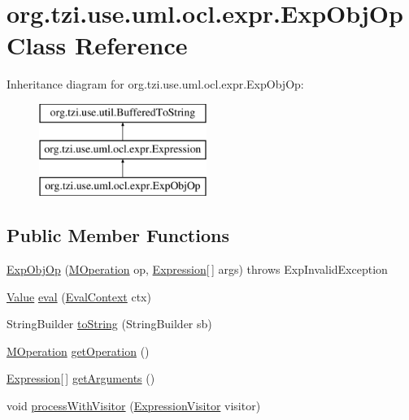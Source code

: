 \hypertarget{classorg_1_1tzi_1_1use_1_1uml_1_1ocl_1_1expr_1_1_exp_obj_op}{\section{org.\-tzi.\-use.\-uml.\-ocl.\-expr.\-Exp\-Obj\-Op Class Reference}
\label{classorg_1_1tzi_1_1use_1_1uml_1_1ocl_1_1expr_1_1_exp_obj_op}
}
Inheritance diagram for org.\-tzi.\-use.\-uml.\-ocl.\-expr.\-Exp\-Obj\-Op\-:\begin{figure}[H]
\begin{center}
\leavevmode
\includegraphics[height=3.000000cm]{classorg_1_1tzi_1_1use_1_1uml_1_1ocl_1_1expr_1_1_exp_obj_op}
\end{center}
\end{figure}
\subsection*{Public Member Functions}
\begin{DoxyCompactItemize}
\item 
\hyperlink{classorg_1_1tzi_1_1use_1_1uml_1_1ocl_1_1expr_1_1_exp_obj_op_ac3a6d164172e7e2cd17d68b379feb969}{Exp\-Obj\-Op} (\hyperlink{classorg_1_1tzi_1_1use_1_1uml_1_1mm_1_1_m_operation}{M\-Operation} op, \hyperlink{classorg_1_1tzi_1_1use_1_1uml_1_1ocl_1_1expr_1_1_expression}{Expression}\mbox{[}$\,$\mbox{]} args)  throws Exp\-Invalid\-Exception     
\item 
\hyperlink{classorg_1_1tzi_1_1use_1_1uml_1_1ocl_1_1value_1_1_value}{Value} \hyperlink{classorg_1_1tzi_1_1use_1_1uml_1_1ocl_1_1expr_1_1_exp_obj_op_aae1c9d0343e090c25177fbd990f68c0a}{eval} (\hyperlink{classorg_1_1tzi_1_1use_1_1uml_1_1ocl_1_1expr_1_1_eval_context}{Eval\-Context} ctx)
\item 
String\-Builder \hyperlink{classorg_1_1tzi_1_1use_1_1uml_1_1ocl_1_1expr_1_1_exp_obj_op_a5f97f040f8ad6763dae2c81bb9fa634e}{to\-String} (String\-Builder sb)
\item 
\hyperlink{classorg_1_1tzi_1_1use_1_1uml_1_1mm_1_1_m_operation}{M\-Operation} \hyperlink{classorg_1_1tzi_1_1use_1_1uml_1_1ocl_1_1expr_1_1_exp_obj_op_a78a791b79eb608d7fae7ea210d9b2c28}{get\-Operation} ()
\item 
\hyperlink{classorg_1_1tzi_1_1use_1_1uml_1_1ocl_1_1expr_1_1_expression}{Expression}\mbox{[}$\,$\mbox{]} \hyperlink{classorg_1_1tzi_1_1use_1_1uml_1_1ocl_1_1expr_1_1_exp_obj_op_a27a3c6ff5f189de3e93db079cb5b8228}{get\-Arguments} ()
\item 
void \hyperlink{classorg_1_1tzi_1_1use_1_1uml_1_1ocl_1_1expr_1_1_exp_obj_op_affeb797408f9592ef1c701ed07328bd0}{process\-With\-Visitor} (\hyperlink{interfaceorg_1_1tzi_1_1use_1_1uml_1_1ocl_1_1expr_1_1_expression_visitor}{Expression\-Visitor} visitor)
\end{DoxyCompactItemize}
